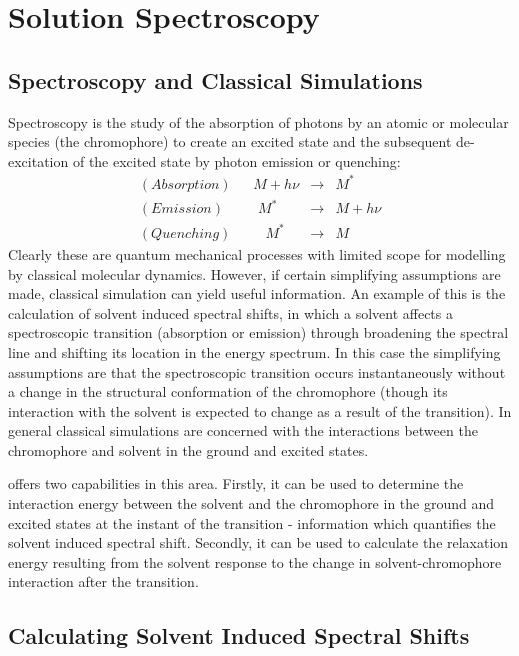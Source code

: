 \section{Solution Spectroscopy}
\label{excitation}  

\subsection{Spectroscopy and Classical Simulations}

Spectroscopy is the study of the absorption of photons by an atomic or
molecular species (the chromophore) to create an excited state and the
subsequent de-excitation of the excited state by photon emission or quenching:
\begin{eqnarray}
  (Absorption)~~~~~~~M+h\nu &\rightarrow & M^{*} \nonumber \\
  (Emission)~~~~~~~~~~~M^{*} &\rightarrow & M+h\nu \\
  (Quenching)~~~~~~~~~~~M^{*} &\rightarrow & M \nonumber
\end{eqnarray}
Clearly these are quantum mechanical processes with limited scope for
modelling by classical molecular dynamics. However, if certain simplifying
assumptions are made, classical simulation can yield useful information. An
example of this is the calculation of solvent induced spectral shifts, in
which a solvent affects a spectroscopic transition (absorption or emission)
through broadening the spectral line and shifting its location in the energy
spectrum.  In this case the simplifying assumptions are that the spectroscopic
transition occurs instantaneously without a change in the structural
conformation of the chromophore (though its interaction with the solvent is
expected to change as a result of the transition).  In general classical
simulations are concerned with the interactions between the chromophore and
solvent in the ground and excited states.

\D{} offers two capabilities in this area. Firstly, it can be used to determine
the interaction energy between the solvent and the chromophore in the ground
and excited states at the instant of the transition - information which
quantifies the solvent induced spectral shift. Secondly, it can be used to
calculate the relaxation energy resulting from the solvent response to the
change in solvent-chromophore interaction after the transition.

\subsection{Calculating Solvent Induced Spectral Shifts}
\label{excited}

